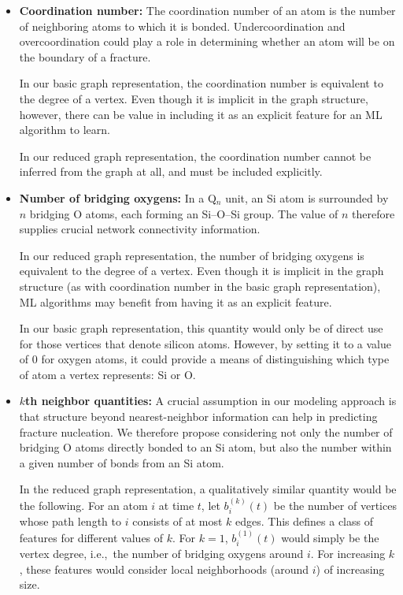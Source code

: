 \begin{itemize}
    \item \textbf{Coordination number:} The coordination number of an atom is the number of neighboring atoms to which it is bonded. Undercoordination and overcoordination could play a role in determining whether an atom will be on the boundary of a fracture.
    
    In our basic graph representation, the coordination number is equivalent to the degree of a vertex.  Even though it is implicit in the graph structure, however, there can be value in including it as an explicit feature for an ML algorithm to learn.
    
    In our reduced graph representation, the coordination number cannot be inferred from the graph at all, and must be included explicitly.

    \item\textbf{Number of bridging oxygens:} In a Q$_n$ unit, an Si atom is surrounded by $n$ bridging O atoms, each forming an Si--O--Si group.  The value of $n$ therefore supplies crucial network connectivity information. 
    
    In our reduced graph representation, the number of bridging oxygens is equivalent to the degree of a vertex.  Even though it is implicit in the graph structure (as with coordination number in the basic graph representation), ML algorithms may benefit from having it as an explicit feature.
    
    In our basic graph representation, this quantity would only be of direct use for those vertices that denote silicon atoms.  However, by setting it to a value of 0 for oxygen atoms, it could provide a means of distinguishing which type of atom a vertex represents: Si or O.

    \item\textbf{$k$th neighbor quantities:} A crucial assumption in our modeling approach is that structure beyond nearest-neighbor information can help in predicting fracture nucleation.  We therefore propose considering not only the number of bridging O atoms directly bonded to an Si atom, but also the number within a given number of bonds from an Si atom.
    
    In the reduced graph representation, a qualitatively similar quantity would be the following.  For an atom $i$ at time $t$, let $b^{(k)}_i(t)$ be the number of vertices whose path length to $i$ consists of at most $k$ edges. This defines a class of features for different values of $k$.  For $k=1$, $b^{(1)}_i(t)$ would simply be the vertex degree, i.e.,\ the number of bridging oxygens around $i$.  For increasing $k$, these features would consider local neighborhoods (around $i$) of increasing size.
    
\end{itemize}

